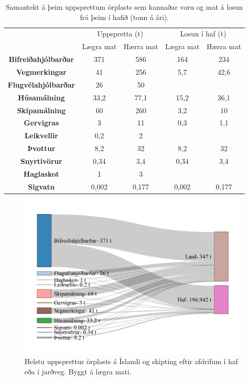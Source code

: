 \documentclass[icelandic,]{book}
\begin{document}
\begin{table}[t]

\caption{\label{tab:samantekuppspr}Samantekt á þeim uppsprettum örplasts sem kannaðar voru og mat á losun frá þeim í hafið (tonn á ári).}
\centering
\begin{tabular}{>{\bfseries}ccc|cc}
\toprule
\multicolumn{1}{c}{ } & \multicolumn{2}{c}{Uppspretta (t)} & \multicolumn{2}{c}{Losun í haf (t)} \\
\cmidrule(l{3pt}r{3pt}){2-3} \cmidrule(l{3pt}r{3pt}){4-5}
 & Lægra mat & Hærra mat & Lægra mat & Hærra mat\\
\midrule
\rowcolor{gray!6} Bifreiðahjólbarðar & 371 & 586 & 164 & 234\\
Vegmerkingar & 41 & 256 & 5,7 & 42,6\\
\rowcolor{gray!6} Flugvélahjólbarðar & 26 & 50 &  & \\
Húsamálning & 33,2 & 77,1 & 15,2 & 36,1\\
\rowcolor{gray!6} Skipamálning & 60 & 260 & 3,2 & 10\\
Gervigras & 3 & 11 & 0,3 & 1,1\\
\rowcolor{gray!6} Leikvellir & 0,2 & 2 &  & \\
Þvottur & 8,2 & 32 & 8,2 & 32\\
\rowcolor{gray!6} Snyrtivörur & 0,34 & 3,4 & 0,34 & 3,4\\
Haglaskot & 1 & 3 &  & \\
\rowcolor{gray!6} Sigvatn & 0,002 & 0,177 & 0,002 & 0,177\\
\bottomrule
\end{tabular}
\end{table}

\begin{figure}[H]

{\centering \includegraphics{_bookdown_files/OrplastHaf_files/figure-latex/unnamed-chunk-6-1} 

}

\caption{Helstu uppsprettur örplasts á Íslandi og skipting eftir afdrifum í haf eða í jarðveg. Byggt á lægra mati.}\label{fig:unnamed-chunk-6}
\end{figure}
\end{document}
